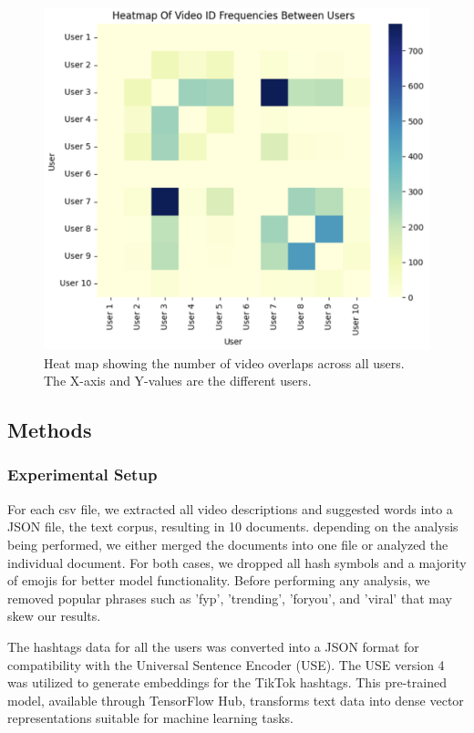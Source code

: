 \documentclass[acmtog]{acmart}
\begin{document}
\begin{figure}[ht]
  \centering
  \includegraphics[width=\linewidth]{Video Overlaps.png}
  \caption{Heat map showing the number of video overlaps across all users. The X-axis and Y-values are the different users. 
  \label{fig:user-user}}
\end{figure}

\subsection{Methods}
\subsubsection{Experimental Setup}
For each csv file, we extracted all video descriptions and suggested words into a JSON file, the text corpus, resulting in 10 documents. depending on the analysis being performed, we either merged the documents into one file or analyzed the individual document. For both cases, we dropped all hash symbols and a majority of emojis for better model functionality. Before performing any analysis, we removed popular phrases such as 'fyp', 'trending', 'foryou', and 'viral' that may skew our results.

The hashtags data for all the users was converted into a JSON format for compatibility with the Universal Sentence Encoder (USE). The USE version 4 was utilized to generate embeddings for the TikTok hashtags. This pre-trained model, available through TensorFlow Hub, transforms text data into dense vector representations suitable for machine learning tasks.
\end{document}
